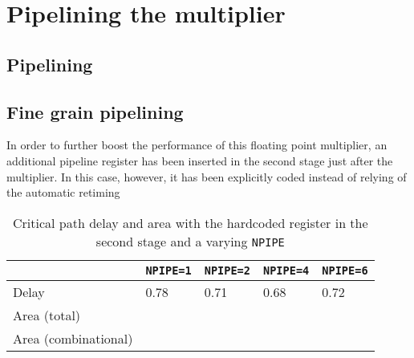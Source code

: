 \chapter{Pipelining the multiplier}
\section{Pipelining}

\section{Fine grain pipelining}
In order to further boost the performance of this floating point multiplier, an additional pipeline register has been inserted in the second stage just after the multiplier. In this case, however, it has been explicitly coded instead of relying of the automatic retiming
\begin{table}
	
	\begin{tabular}{|l|l|l|l|l|}
	\hline
	&\texttt{NPIPE=1} & \texttt{NPIPE=2} & \texttt{NPIPE=4} & \texttt{NPIPE=6}\\\hline
	Delay & 0.78 & 0.71 & 0.68 & 0.72 \\\hline
	Area (total) & & & & \\\hline
	Area (combinational) & & & & \\\hline
	\end{tabular}

	\caption{Critical path delay and area with the hardcoded register in the second stage and a varying \texttt{NPIPE}}
	\label{tab:stage2}
\end{table}